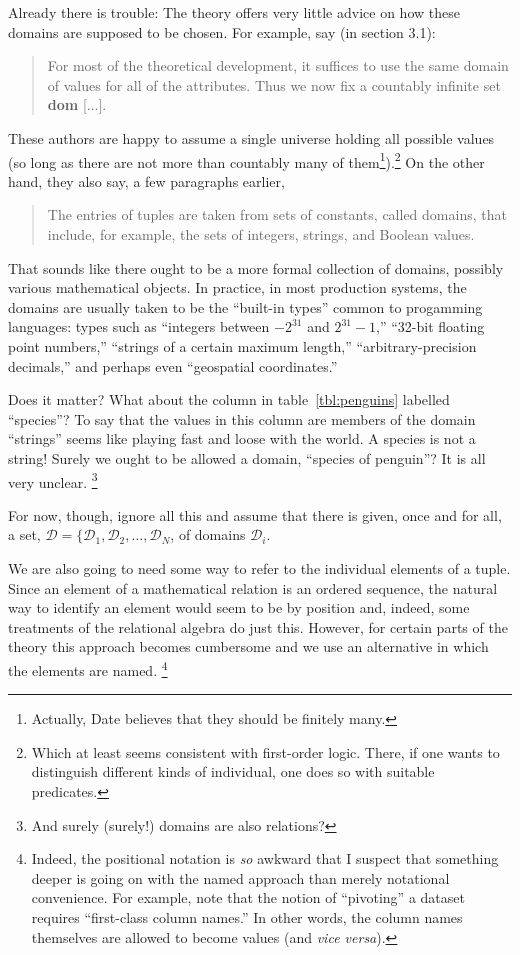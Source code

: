 \documentclass[10pt, a4paper, twocolumn]{article}
\begin{document}
Already there is trouble: The theory offers very little advice on how these
domains are supposed to be chosen. For example,
\textcite{abiteboul1995foundations} say (in section 3.1):
\begin{quote}
  For most of the theoretical development, it suffices to use the same domain of
  values for all of the attributes. Thus we now fix a countably infinite set
  \textbf{dom} [...].
\end{quote}
These authors are happy to assume a single universe holding all possible values
(so long as there are not more than countably many of them\footnote{Actually,
Date believes that they should be finitely many.}).\footnote{Which at
least seems consistent with first-order logic. There, if one wants to distinguish
different kinds of individual, one does so with suitable predicates.} On the
other hand, they also say, a few paragraphs earlier,
\begin{quote}
  The entries of tuples are taken from sets of constants, called domains, that
  include, for example, the sets of integers, strings, and Boolean values.
\end{quote}
That sounds like there ought to be a more formal collection of domains, possibly
various mathematical objects. In practice, in most production systems, the
domains are usually taken to be the ``built-in types'' common to progamming
languages: types such as ``integers between $-2^{31}$ and $2^{31}-1$,'' ``32-bit
floating point numbers,'' ``strings of a certain maximum length,''
``arbitrary-precision decimals,'' and perhaps even ``geospatial coordinates.''

Does it matter? What about the column in table~\ref{tbl:penguins} labelled
``species''? To say that the values in this column are members of the domain
``strings'' seems like playing fast and loose with the world. A species is not a
string! Surely we ought to be allowed a domain, ``species of penguin''? It is
all very unclear.%
\footnote{And surely (surely!) domains are also relations?}

For now, though, ignore all this and assume that there is given, once and for
all, a set, $\mathscr{D} = \{\mathscr{D}_1, \mathscr{D}_2, \dotsc,
\mathscr{D}_N$, of domains $\mathscr{D}_i$.

We are also going to need some way to refer to the individual elements of a
tuple. Since an element of a mathematical relation is an ordered sequence, the
natural way to identify an element would seem to be by position and, indeed,
some treatments of the relational algebra do just this. However, for certain
parts of the theory this approach becomes cumbersome and we use an alternative
in which the elements are named.%
\footnote{Indeed, the positional notation is \emph{so} awkward that I suspect
that something deeper is going on with the named approach than merely notational
convenience. For example, \textcite{brown2022tables} note that the notion of
``pivoting'' a dataset requires ``first-class column names.'' In other words,
the column names themselves are allowed to become values (and \textit{vice
  versa}).}
\end{document}
